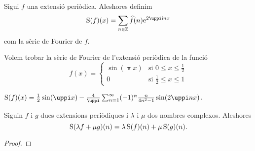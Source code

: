 \documentclass[../../Main.tex]{subfiles}
\begin{document}
	\begin{definition}
		\label{def:sèrie de Fourier}
		Sigui \(f\) una extensió periòdica. Aleshores definim
		\[\sfourier(f)(x)=\sum_{n\in\mathbb{Z}}\widehat{f}(n)\e^{2\uppi\iu nx}\]
		com la sèrie de Fourier de \(f\).
	\end{definition}
	\begin{example}
		\label{ex:trobar una sèrie de Fourier}
		Volem trobar la sèrie de Fourier de l'extensió periòdica de la funció
		\[f(x)=\begin{cases}
			\sin(\uppi x) & \text{si } 0\leq x\leq\frac{1}{2} \\
			0 & \text{si }\frac{1}{2}\leq x\leq 1
		\end{cases}\]
		\begin{solution}
			\(\sfourier(f)(x)=\frac{1}{2}\sin(\uppi x)-\frac{4}{\uppi}\sum_{n=1}^{\infty}(-1)^{n}\frac{n}{4n^{2}-1}\sin(2\uppi nx)\).
		\end{solution}
	\end{example}
	\begin{proposition}
		\label{prop:les sèries de Fourier són lineals}
		Siguin \(f\) i \(g\) dues extensions periòdiques i \(\lambda\) i \(\mu\) dos nombres complexos. Aleshores
		\[\operatorname{S}(\lambda f+\mu g)(n)=\lambda\operatorname{S}(f)(n)+\mu\operatorname{S}(g)(n).\]
		\begin{proof}
		\end{proof}
	\end{proposition}
\end{document}
